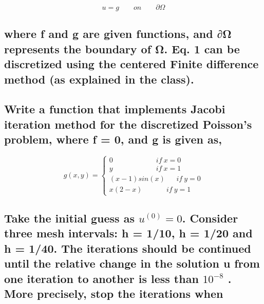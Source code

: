 \documentclass[11pt]{article}
\begin{document}
\[u = g \qquad on \qquad \partial \Omega \tag{2}\]

    \hypertarget{where-f-and-g-are-given-functions-and-ux3c9-represents-the-boundary-of-ux3c9.-eq.-1-can-be-discretized-using-the-centered-finite-difference-method-as-explained-in-the-class.}{%
\subsection{where f and g are given functions, and ∂Ω represents the
boundary of Ω. Eq. 1 can be discretized using the centered Finite
difference method (as explained in the
class).}\label{where-f-and-g-are-given-functions-and-ux3c9-represents-the-boundary-of-ux3c9.-eq.-1-can-be-discretized-using-the-centered-finite-difference-method-as-explained-in-the-class.}}

    \hypertarget{write-a-function-that-implements-jacobi-iteration-method-for-the-discretized-poissons-problem-where-f-0-and-g-is-given-as}{%
\subsection{Write a function that implements Jacobi iteration method for
the discretized Poisson's problem, where f = 0, and g is given
as,}\label{write-a-function-that-implements-jacobi-iteration-method-for-the-discretized-poissons-problem-where-f-0-and-g-is-given-as}}

    \[g(x,y) = \begin{cases}
0 \qquad\qquad\qquad if\:x = 0
\\
y \qquad\qquad\qquad if\:x = 1
\\
(x-1)sin(x) \:\:\:\:\:\:\: if\:y = 0
\\
x(2-x) \qquad\:\:\:\:\:\: if\:y = 1
\end{cases}\]

    \hypertarget{take-the-initial-guess-as-u0-0.-consider-three-mesh-intervals-h-110-h-120-and-h-140.-the-iterations-should-be-continued-until-the-relative-change-in-the-solution-u-from-one-iteration-to-another-is-less-than-10-8-.-more-precisely-stop-the-iterations-when}{%
\subsection{\texorpdfstring{Take the initial guess as \(u^{(0)} = 0\).
Consider three mesh intervals: h = 1/10, h = 1/20 and h = 1/40. The
iterations should be continued until the relative change in the solution
u from one iteration to another is less than \(10^{-8}\) . More
precisely, stop the iterations
when}{Take the initial guess as u\^{}\{(0)\} = 0. Consider three mesh intervals: h = 1/10, h = 1/20 and h = 1/40. The iterations should be continued until the relative change in the solution u from one iteration to another is less than 10\^{}\{-8\} . More precisely, stop the iterations when}}\label{take-the-initial-guess-as-u0-0.-consider-three-mesh-intervals-h-110-h-120-and-h-140.-the-iterations-should-be-continued-until-the-relative-change-in-the-solution-u-from-one-iteration-to-another-is-less-than-10-8-.-more-precisely-stop-the-iterations-when}}
\end{document}
